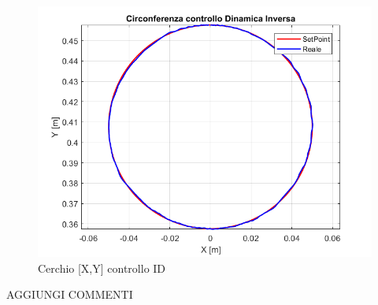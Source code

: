 \begin{figure}[ht]
	\begin{center}
		\includegraphics[scale=0.5]{Immagini/Traiettorie/CerchioDinamicaInversa}
		\caption{Cerchio [X,Y] controllo ID}
		\label{fig:IDbracciaC}
	\end{center}
\end{figure}
AGGIUNGI COMMENTI
